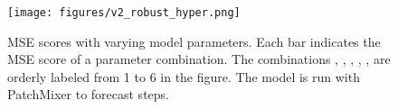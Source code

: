 \documentclass{article} \usepackage{iclr2024_conference,times}
\begin{document}
\begin{figure}[h]
\begin{center}
\texttt{[image: figures/v2\_robust\_hyper.png]}
\end{center}
\caption{MSE scores with varying model parameters. Each bar indicates the MSE score of a parameter combination. The combinations , , , , ,  are orderly labeled from 1 to 6 in the figure. The model is run with PatchMixer to forecast  steps.}
\label{fig::robustness}
\end{figure}
\end{document}

